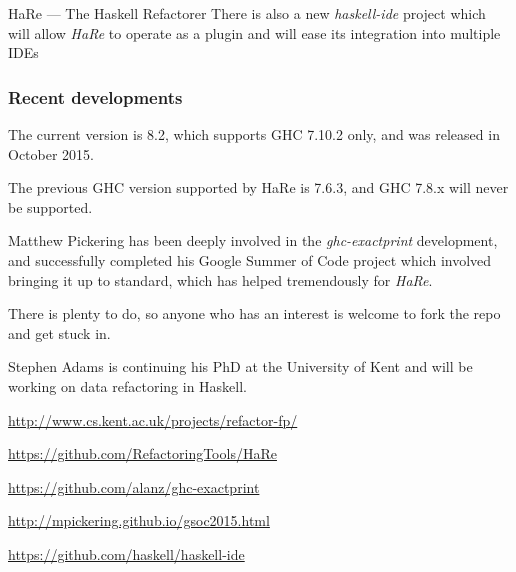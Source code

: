 \documentclass[DIV16,twocolumn,10pt]{scrreprt}
\begin{document}
\begin{hcarentry}[updated]{HaRe --- The Haskell Refactorer}
There is also a new \emph{haskell-ide} project which will allow \emph{HaRe} to operate
as a plugin and will ease its integration into multiple IDEs 

\subsubsection*{Recent developments}
\begin{compactitem}

\item The current version is 8.2, which supports GHC 7.10.2 only, and was
  released in October 2015.

\item The previous GHC version supported by HaRe is 7.6.3, and GHC 7.8.x will
  never be supported.

\item Matthew Pickering has been deeply involved in the \emph{ghc-exactprint}
  development, and successfully completed his Google Summer of Code project
  which involved bringing it up to standard, which has helped tremendously for
  \emph{HaRe}.

\item There is plenty to do, so anyone who has an interest is welcome
  to fork the repo and get stuck in.

\item Stephen Adams is continuing his PhD at the University of Kent and
  will be working on data refactoring in Haskell.
\end{compactitem}

\FurtherReading
\begin{compactitem}
\item \url{http://www.cs.kent.ac.uk/projects/refactor-fp/}
\item \url{https://github.com/RefactoringTools/HaRe}
\item \url{https://github.com/alanz/ghc-exactprint}
\item \url{ http://mpickering.github.io/gsoc2015.html}
\item \url{https://github.com/haskell/haskell-ide}
\end{compactitem}
\end{hcarentry}
\end{document}
